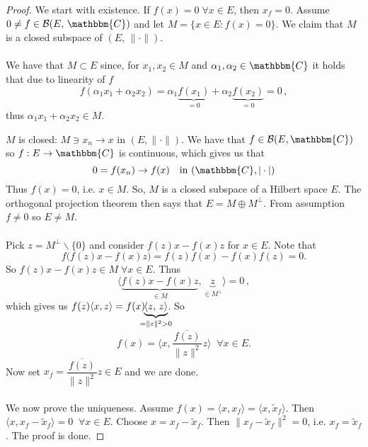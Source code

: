\documentclass[12pt, a4paper]{article}
\newcommand{\C}{\ensuremath{\mathbbm{C}}}
\begin{document}
\begin{proof}
We start with existence. If $f(x) = 0\;\forall x\in E$, then $x_f = 0$. Assume $0\neq f \in \mathcal{B}(E,\,\C)$ and let $M=\{x\in E : f(x) = 0\}$. We claim that $M$ is a closed subspace of $(E,\,\|\cdot\|)$. 
\\\\
We have that $M\subset E$ since, for $x_1, x_2\in M$ and $\alpha_1, \alpha_2 \in \C$ it holds that due to linearity of $f$
\begin{equation*}
f(\alpha_1 x_1 + \alpha_2 x_2) = \alpha_1 \underbrace{f(x_1)}_{=0} + \alpha_2 \underbrace{f(x_2)}_{=0} = 0\,,
\end{equation*}
thus $\alpha_1 x_1 + \alpha_2 x_2 \in M$. 

\noindent $M$ is closed: $M\ni x_n \to x$ in $(E, \| \cdot \|)$. We have that $f\in\mathcal{B}(E, \C)$ so $f: E \to \C$ is continuous, which gives us that
\begin{equation*}
0 = f(x_n) \to f(x) \quad \text{in } (\C, |\cdot|)
\end{equation*}
Thus $f(x) = 0$, i.e. $x\in M$. So, $M$ is a closed subspace of a Hilbert space $E$. The orthogonal projection theorem then says that $E = M \oplus M^\perp$. From assumption $f\neq 0$ so $E\neq M$. 
\\\\
Pick $z = M^\perp \backslash \{0\}$ and consider $f(z)x - f(x)z$ for $x\in E$. Note that
\begin{equation*}
f\big(f(z)x - f(x)z\big) = f(z)f(x) -f(x)f(z) = 0.
\end{equation*}
So $f(z)x-f(x)z \in M\;\forall x\in E$. Thus
\begin{equation*}
\langle \underbrace{f(z)x - f(x)z}_{\in M}, \underbrace{z}_{\in M^\perp}\rangle = 0\,,
\end{equation*}
which gives us $f(z)\langle x, z\rangle = f(x) \hspace{-7pt}\underbrace{\langle z,\,z\rangle}_{=\|z\|^2 > 0}\hspace{-5pt}$. So
\begin{equation*}
f(x) = \langle x, \dfrac{\overline{f(z)}}{\|z\|^2}z \rangle \;\; \forall x\in E.
\end{equation*}
Now set $x_f = \dfrac{\overline{f(z)}}{\|z\|^2}z \in E$ and we are done.
\\\\
We now prove the uniqueness. Assume $f(x) = \langle x, x_f \rangle = \langle x, \tilde{x}_f\rangle$. Then $\langle x, x_f - \tilde{x}_f\rangle = 0 \;\; \forall x\in E$. Choose $x=x_f - \tilde{x}_f$. Then $\| x_f - \tilde{x}_f \|^2 = 0$, i.e. $x_f = \tilde{x}_f$. The proof is done.
\end{proof}
\end{document}
